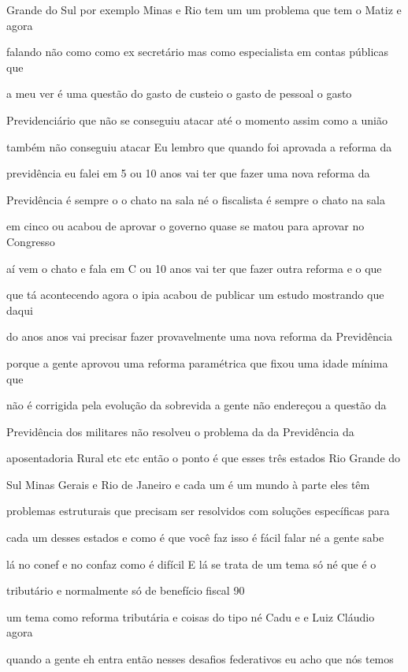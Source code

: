 \documentclass[a4paper,12pt]{article}
\begin{document}
Grande do Sul por exemplo Minas e Rio tem um um problema que tem o Matiz e agora

falando não como como ex secretário mas como especialista em contas públicas que

a meu ver é uma questão do gasto de custeio o gasto de pessoal o gasto

Previdenciário que não se conseguiu atacar até o momento assim como a união

também não conseguiu atacar Eu lembro que quando foi aprovada a reforma da

previdência eu falei em 5 ou 10 anos vai ter que fazer uma nova reforma da

Previdência é sempre o o chato na sala né o fiscalista é sempre o chato na sala

em cinco ou acabou de aprovar o governo quase se matou para aprovar no Congresso

aí vem o chato e fala em C ou 10 anos vai ter que fazer outra reforma e o que

que tá acontecendo agora o ipia acabou de publicar um estudo mostrando que daqui

do anos anos vai precisar fazer provavelmente uma nova reforma da Previdência

porque a gente aprovou uma reforma paramétrica que fixou uma idade mínima que

não é corrigida pela evolução da sobrevida a gente não endereçou a questão da

Previdência dos militares não resolveu o problema da da Previdência da

aposentadoria Rural etc etc então o ponto é que esses três estados Rio Grande do

Sul Minas Gerais e Rio de Janeiro e cada um é um mundo à parte eles têm

problemas estruturais que precisam ser resolvidos com soluções específicas para

cada um desses estados e como é que você faz isso é fácil falar né a gente sabe

lá no conef e no confaz como é difícil E lá se trata de um tema só né que é o

tributário e normalmente só de benefício fiscal 90%

um tema como reforma tributária e coisas do tipo né Cadu e e Luiz Cláudio agora

quando a gente eh entra então nesses desafios federativos eu acho que nós temos
\end{document}
